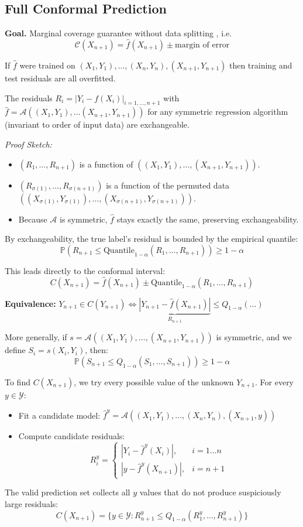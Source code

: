 \subsection{Full Conformal Prediction}

\textbf{Goal.} Marginal coverage guarantee without data splitting , i.e.
$$\mathcal{C}(X_{n+1}) = \hat{f}(X_{n+1}) \pm \text{margin of error}$$

If $\hat{f}$ were trained on $(X_1,Y_1),\dots, (X_n,Y_n),(X_{n+1},Y_{n+1})$ then training and test residuals are all overfitted.

The residuals $R_i = |Y_i - f(X_i)|_{i=1,\dots, n+1}$ with $\hat{f}= \mathcal{A}((X_1,Y_1),\dots (X_{n+1},Y_{n+1}))$ for any symmetric regression algorithm (invariant to order of input data) are exchangeable. 

\noindent \textit{Proof Sketch:}
\begin{itemize}
    \item $(R_1, \dots, R_{n+1})$ is a function of $((X_1, Y_1), \dots, (X_{n+1}, Y_{n+1}))$.
    \item $(R_{\sigma(1)}, \dots, R_{\sigma(n+1)})$ is a function of the permuted data $((X_{\sigma(1)}, Y_{\sigma(1)}), \dots, (X_{\sigma(n+1)}, Y_{\sigma(n+1)}))$.
    \item Because $\mathcal{A}$ is symmetric, $\hat{f}$ stays exactly the same, preserving exchangeability.
\end{itemize}

By exchangeability, the true label's residual is bounded by the empirical quantile:
\[ \mathbb{P}(R_{n+1} \le \text{Quantile}_{1-\alpha}(R_1, \dots, R_{n+1})) \ge 1-\alpha \]

This leads directly to the conformal interval:
\[ C(X_{n+1}) = \hat{f}(X_{n+1}) \pm \text{Quantile}_{1-\alpha}(R_1, \dots, R_{n+1}) \]

\noindent \textbf{Equivalence:} 
$Y_{n+1} \in C(Y_{n+1}) \iff \underbrace{|Y_{n+1} - \hat{f}(X_{n+1})|}_{R_{n+1}} \le Q_{1-\alpha}(\dots)$

More generally, if $s = \mathcal{A}((X_1, Y_1), \dots, (X_{n+1}, Y_{n+1}))$ is symmetric, and we define $S_i = s(X_i, Y_i)$, then:
\[ \mathbb{P}(S_{n+1} \le Q_{1-\alpha}(S_1, \dots, S_{n+1})) \ge 1-\alpha \]

To find $C(X_{n+1})$, we try every possible value of the unknown $Y_{n+1}$. For every $y \in \mathcal{Y}$:
\begin{itemize}
    \item Fit a candidate model: $\hat{f}^y = \mathcal{A}((X_1, Y_1), \dots, (X_n, Y_n), (X_{n+1}, y))$
    \item Compute candidate residuals: 
    \[ R_i^y = \begin{cases} |Y_i - \hat{f}^y(X_i)|, & i=1 \dots n \\ |y - \hat{f}^y(X_{n+1})|, & i=n+1 \end{cases} \]
\end{itemize}
The valid prediction set collects all $y$ values that do not produce suspiciously large residuals:
\[ C(X_{n+1}) = \{ y \in \mathcal{Y} : R_{n+1}^y \le Q_{1-\alpha}(R_1^y, \dots, R_{n+1}^y) \} \]

